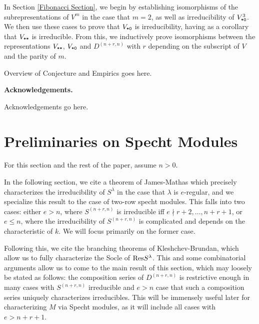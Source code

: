 \documentclass{amsart}
\newcommand{\fakesubsection}[1]{
    \vspace{7pt}
    \noindent \textbf{#1.}
  }
\begin{document}
  In Section \ref{Fibonacci Section}, we begin by establishing isomorphisms of the subrepresentations of $V^m$ in the case that $m = 2$, as well as irreducibility of $V^3_{\texttt{*}\texttt{0}}$.
  We then use these cases to prove that $V_{\texttt{*}\texttt{0}}$ is irreducibility, having as a corollary that $V_{\texttt{*}\texttt{*}}$ is irreducible.
  From this, we inductively prove isomorphisms between the representations $V_{\texttt{*}\texttt{*}}$, $V_{\texttt{*}\texttt{0}}$ and $D^{(n+r,n)}$ with $r$ depending on the subscript of $V$ and the parity of $m$.

  {\color{orange} Overview of Conjecture and Empirics goes here.}

  \fakesubsection{Acknowledgements}
  {\color{orange} Acknowledgements go here.}

  \newpage
   
\section{Preliminaries on Specht Modules}\label{Specht Modules Section}
  For this section and the rest of the paper, assume $n > 0$.

  In the following section, we cite a theorem of James-Mathas which precisely characterizes the irreducibility of $S^\lambda$ in the case that $\lambda$ is $e$-regular, and we specialize this result to the case of two-row specht modules.
  This falls into two cases: either $e > n$, where $S^{(n+r,n)}$ is irreducible iff $e \nmid r+2,\dots,n+r+1$, or $e \leq n$, where the irreducibility of $S^{(n+r,n)}$ is complicated and depends on the characteristic of $k$.
  We will focus primarily on the former case.

  Following this, we cite the branching theorems of Kleshchev-Brundan, which allow us to fully characterize the Socle of $\text{Res} S^{\lambda}$.
  This and some combinatorial arguments allow us to come to the main result of this section, which may loosely be stated as follows:
  the composition series of $D^{(n+r,n)}$ is restrictive enough in many cases with $S^{(n+r,n)}$ irreducible and $e > n$ case that such a composition series uniquely characterizes irreducibles.
  This will be immensely useful later for characterizing $M$ via Specht modules, as it will include all cases with $e > n + r + 1$.
\end{document}
